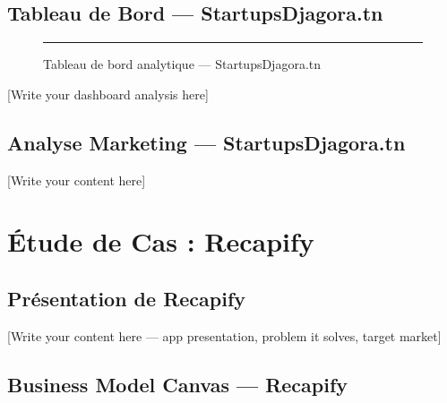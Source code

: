 \subsection{Tableau de Bord — StartupsDjagora.tn}
\label{sec:djagora-dashboard}

\begin{figure}[H]
  \centering
  \rule{0.95\textwidth}{6cm} %
  \caption{Tableau de bord analytique — StartupsDjagora.tn}
  \label{fig:djagora-dashboard}
\end{figure}

[Write your dashboard analysis here]

\subsection{Analyse Marketing — StartupsDjagora.tn}
\label{sec:djagora-marketing}

[Write your content here]


\section{Étude de Cas : Recapify}
\label{sec:recapify}

\subsection{Présentation de Recapify}
\label{sec:recapify-presentation}

[Write your content here — app presentation, problem it solves, target market]

\subsection{Business Model Canvas — Recapify}
\label{sec:recapify-bmc}




